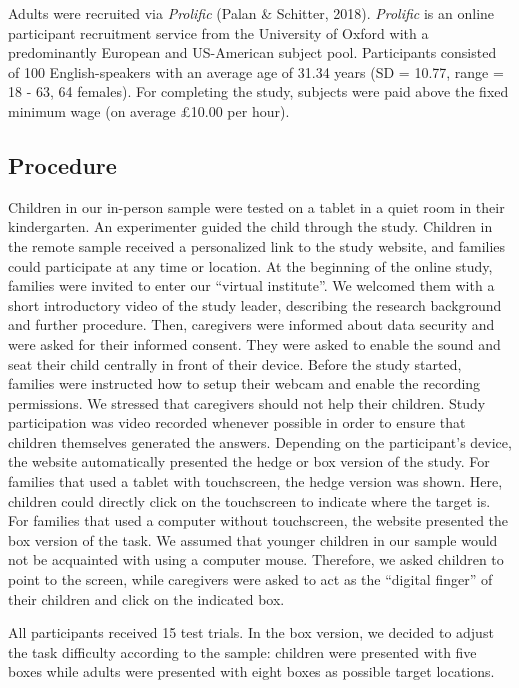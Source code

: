 \documentclass[
  man,floatsintext]{apa6}
\begin{document}
Adults were recruited via \emph{Prolific} (Palan \& Schitter, 2018).
\emph{Prolific} is an online participant recruitment service from the University of Oxford with a predominantly European and US-American subject pool.
Participants consisted of 100 English-speakers with an average age of 31.34 years (SD = 10.77, range = 18 - 63, 64 females).
For completing the study, subjects were paid above the fixed minimum wage (on average £10.00 per hour).

\hypertarget{procedure}{%
\subsection{Procedure}\label{procedure}}

Children in our in-person sample were tested on a tablet in a quiet room in their kindergarten.
An experimenter guided the child through the study.
Children in the remote sample received a personalized link to the study website, and families could participate at any time or location.
At the beginning of the online study, families were invited to enter our ``virtual institute''.
We welcomed them with a short introductory video of the study leader, describing the research background and further procedure.
Then, caregivers were informed about data security and were asked for their informed consent.
They were asked to enable the sound and seat their child centrally in front of their device.
Before the study started, families were instructed how to setup their webcam and enable the recording permissions.
We stressed that caregivers should not help their children.
Study participation was video recorded whenever possible in order to ensure that children themselves generated the answers.
Depending on the participant's device, the website automatically presented the hedge or box version of the study.
For families that used a tablet with touchscreen, the hedge version was shown.
Here, children could directly click on the touchscreen to indicate where the target is.
For families that used a computer without touchscreen, the website presented the box version of the task.
We assumed that younger children in our sample would not be acquainted with using a computer mouse.
Therefore, we asked children to point to the screen, while caregivers were asked to act as the ``digital finger'' of their children and click on the indicated box.

All participants received 15 test trials.
In the box version, we decided to adjust the task difficulty according to the sample: children were presented with five boxes while adults were presented with eight boxes as possible target locations.
\end{document}
